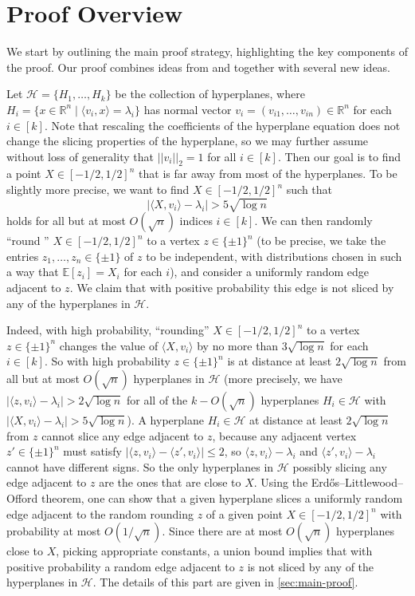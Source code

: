 \documentclass[reqno]{amsart}
\theoremstyle{remark}
\theoremstyle{definition}
\numberwithin{theorem}{section}
\renewcommand{\(}{\bigl(}
\renewcommand{\)}{\bigr)\vphantom{)}}
\newcommand{\cH}{\mathcal H}
\newcommand{\E}{\mathbb{E}}
\renewcommand{\le}{\leqslant}
\newcommand{\R}{\mathbb R}
\newcommand{\ang}[1]{\langle#1\rangle}
\newcommand{\bin}{\{\pm 1\}}
\begin{document}
\section{Proof Overview}\label{sec:overview}

We start by outlining the main proof strategy, highlighting the key components of the proof. Our proof combines ideas from \cite{yehuda2021slicing} and \cite{klein2022slicing} together with several new ideas. 


Let $\cH = \{H_1,\dots, H_k\}$ be the collection of hyperplanes, where $H_i = \{x\in \R^n \mid \ang{v_i, x} = \lambda_i\}$ has normal vector $v_i = (v_{i1}, \dots, v_{in})\in \R^n$ for each $i\in [k]$. Note that rescaling the coefficients of the hyperplane equation does not change the slicing properties of the hyperplane, so we may further assume without loss of generality that $||v_i||_2 = 1$ for all $i\in [k]$. Then our goal is to find a point $X\in [-1/2,1/2]^n$ that is far away from most of the hyperplanes. To be slightly more precise, we want to find $X\in [-1/2,1/2]^n$ such that 
\[|\ang{X, v_i} - \lambda_i| > 5\sqrt{\log n}\]
holds for all but at most $O(\sqrt{n})$ indices $i\in [k]$. We can then randomly ``round '' $X\in [-1/2,1/2]^n$ to a vertex $z\in \bin^n$ (to be precise, we take the entries $z_1,\dots,z_n\in \bin$ of $z$ to be independent, with distributions chosen in such a way that $\E[z_i]=X_i$ for each $i$), and consider a uniformly random edge adjacent to $z$. We claim that with positive probability this edge is not sliced by any of the hyperplanes in $\cH$. 

Indeed, with high probability, ``rounding'' $X\in [-1/2,1/2]^n$ to a vertex $z\in \bin^n$ changes the value of $\ang{X,v_i}$ by no more than $3\sqrt{\log n}$ for each $i\in [k]$. So with high probability $z\in \bin^n$ is at distance at least $2\sqrt{\log n}$ from all but at most $O(\sqrt{n})$ hyperplanes in $\cH$ (more precisely, we have $|\ang{z, v_i} - \lambda_i| > 2\sqrt{\log n}$ for all of the $k-O(\sqrt{n})$ hyperplanes $H_i\in \cH$ with $|\ang{X, v_i} - \lambda_i| > 5\sqrt{\log n}$). A hyperplane $H_i\in \cH$ at distance at least $2\sqrt{\log n}$ from $z$ cannot slice any edge adjacent to $z$, because any adjacent vertex $z'\in \bin^n$ must satisfy $|\ang{z,v_i} - \ang{z', v_i}|\le 2$, so $\ang{z,v_i} - \lambda_i$ and $\ang{z', v_i}-\lambda_i$ cannot have different signs. So the only hyperplanes in $\cH$ possibly slicing any edge adjacent to $z$ are the ones that are close to $X$. Using the Erd\H{o}s--Littlewood--Offord theorem, one can show that a given hyperplane slices a uniformly random edge adjacent to the random rounding $z$ of a given point $X\in [-1/2,1/2]^n$ with probability at most $O(1/\sqrt{n})$. Since there are at most $O(\sqrt{n})$ hyperplanes close to $X$, picking appropriate constants, a union bound implies that with positive probability a random edge adjacent to $z$ is not sliced by any of the hyperplanes in $\cH$. The details of this part are given in \cref{sec:main-proof}.
\end{document}
